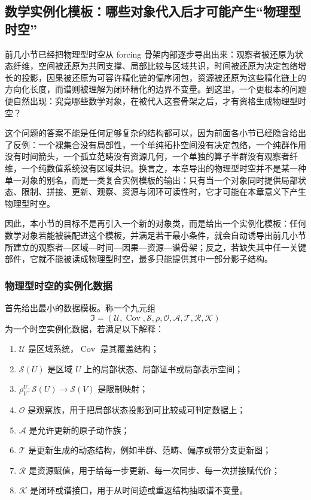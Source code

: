 \subsection{数学实例化模板：哪些对象代入后才可能产生“物理型时空”}\label{subsec:physical-spacetime-skeleton-instantiation-template}

前几小节已经把物理型时空从 forcing 骨架内部逐步导出出来：观察者被还原为状态纤维，空间被还原为共同支撑、局部比较与区域共识，时间被还原为决定包络增长的投影，因果被还原为可容许精化链的偏序闭包，资源被还原为这些精化链上的方向化长度，而谱则被理解为闭环精化的边界不变量。到这里，一个更根本的问题便自然出现：究竟哪些数学对象，在被代入这套骨架之后，才有资格生成物理型时空？

这个问题的答案不能是任何足够复杂的结构都可以，因为前面各小节已经隐含给出了反例：一个裸集合没有局部性，一个单纯拓扑空间没有决定包络，一个纯群作用没有时间箭头，一个孤立范畴没有资源几何，一个单独的算子半群没有观察者纤维，一个纯数值系统没有区域共识。换言之，本章导出的物理型时空并不是某一种单一对象的别名，而是一类复合实例模板的输出：只有当一个对象同时提供局部状态、限制、拼接、更新、观察、资源与闭环可读性时，它才可能在本章意义下产生物理型时空。

因此，本小节的目标不是再引入一个新的对象类，而是给出一个实例化模板：任何数学对象若能被装配进这个模板，并满足若干最小条件，就会自动诱导出前几小节所建立的观察者—区域—时间—因果—资源—谱骨架；反之，若缺失其中任一关键部件，它就不能被读成物理型时空，最多只能提供其中一部分影子结构。

\subsubsection{物理型时空的实例化数据}

首先给出最小的数据模板。称一个九元组
\[
\mathfrak I=
(\mathcal U,\operatorname{Cov},\mathcal S,\rho,\mathcal O,\mathcal A,\mathcal T,\mathcal R,\mathcal K)
\]
为一个时空实例化数据，若满足以下解释：
\begin{enumerate}
  \item \(\mathcal U\) 是区域系统，\(\operatorname{Cov}\) 是其覆盖结构；
  \item \(\mathcal S(U)\) 是区域 \(U\) 上的局部状态、局部证书或局部表示空间；
  \item \(\rho^U_V:\mathcal S(U)\to \mathcal S(V)\) 是限制映射；
  \item \(\mathcal O\) 是观察族，用于把局部状态投影到可比较或可判定数据上；
  \item \(\mathcal A\) 是允许更新的原子动作族；
  \item \(\mathcal T\) 是更新生成的动态结构，例如半群、范畴、偏序或带分支更新图；
  \item \(\mathcal R\) 是资源赋值，用于给每一步更新、每一次同步、每一次拼接赋代价；
  \item \(\mathcal K\) 是闭环或谱接口，用于从时间迹或重返结构抽取谱不变量。
\end{enumerate}

